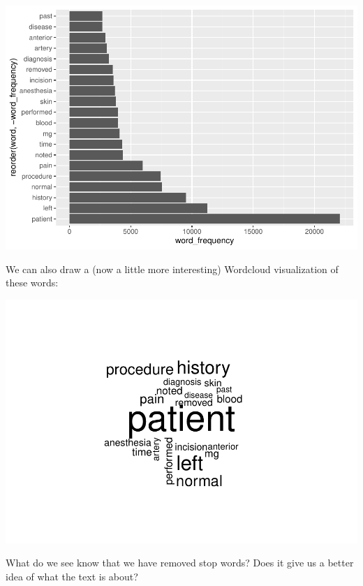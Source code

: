 \documentclass[
]{article}
\newenvironment{Shaded}{\begin{snugshade}}{\end{snugshade}}
\newcommand{\FunctionTok}[1]{\textcolor[rgb]{0.00,0.00,0.00}{#1}}
\newcommand{\NormalTok}[1]{#1}
\newcommand{\SpecialCharTok}[1]{\textcolor[rgb]{0.00,0.00,0.00}{#1}}
\begin{document}
\includegraphics{lab08-text-mining_files/figure-latex/unnamed-chunk-8-1.pdf}

We can also draw a (now a little more interesting) Wordcloud
visualization of these words:

\begin{Shaded}
\end{Shaded}

\includegraphics{lab08-text-mining_files/figure-latex/unnamed-chunk-9-1.pdf}

What do we see know that we have removed stop words? Does it give us a
better idea of what the text is about?
\end{document}
